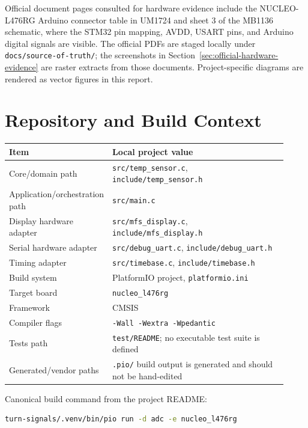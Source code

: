 \documentclass[11pt,a4paper]{article}
\begin{document}
Official document pages consulted for hardware evidence include the
NUCLEO-L476RG Arduino connector table in UM1724 and sheet 3 of the MB1136
schematic, where the STM32 pin mapping, AVDD, USART pins, and Arduino digital
signals are visible. The official PDFs are staged locally under
\texttt{docs/source-of-truth/}; the screenshots in
Section~\ref{sec:official-hardware-evidence} are raster extracts from those
documents. Project-specific diagrams are rendered as vector figures in this
report.

\section{Repository and Build Context}

\begin{longtable}{>{\raggedright\arraybackslash}p{0.28\linewidth}p{0.64\linewidth}}
\toprule
Item & Local project value \\
\midrule
\endhead
Core/domain path & \texttt{src/temp\_sensor.c}, \texttt{include/temp\_sensor.h} \\
Application/orchestration path & \texttt{src/main.c} \\
Display hardware adapter & \texttt{src/mfs\_display.c}, \texttt{include/mfs\_display.h} \\
Serial hardware adapter & \texttt{src/debug\_uart.c}, \texttt{include/debug\_uart.h} \\
Timing adapter & \texttt{src/timebase.c}, \texttt{include/timebase.h} \\
Build system & PlatformIO project, \texttt{platformio.ini} \\
Target board & \texttt{nucleo\_l476rg} \\
Framework & CMSIS \\
Compiler flags & \texttt{-Wall -Wextra -Wpedantic} \\
Tests path & \texttt{test/README}; no executable test suite is defined \\
Generated/vendor paths & \texttt{.pio/} build output is generated and should not be hand-edited \\
\bottomrule
\end{longtable}

Canonical build command from the project README:

\begin{lstlisting}[language=bash]
turn-signals/.venv/bin/pio run -d adc -e nucleo_l476rg
\end{lstlisting}
\end{document}
